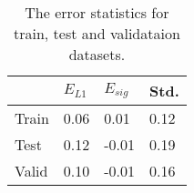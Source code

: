 \begin{table}[h] 
\centering
\begin{tabular}{l||lll}
\hline
& $E_{L1}$ & $E_{sig}$ & Std. \\
\hline
Train 	& 0.06	& 0.01	& 0.12\\
Test 	& 0.12	& -0.01	& 0.19\\
Valid 	& 0.10	& -0.01	& 0.16
\end{tabular}
\caption{The error statistics for train, test and validataion datasets.}
\label{table:table_errors}
\end{table}